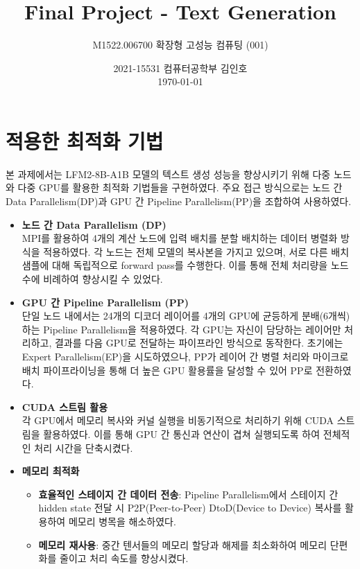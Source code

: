 \documentclass[10pt]{article}
\title{\bfseries Final Project - Text Generation}
\author{M1522.006700 확장형 고성능 컴퓨팅 (001)}
\date{2021-15531 컴퓨터공학부 김인호\\ \today}
\begin{document}
\maketitle

\section{적용한 최적화 기법}

본 과제에서는 LFM2-8B-A1B 모델의 텍스트 생성 성능을 향상시키기 위해 다중 노드와 다중 GPU를 활용한 최적화 기법들을 구현하였다. 주요 접근 방식으로는 노드 간 Data Parallelism(DP)과 GPU 간 Pipeline Parallelism(PP)을 조합하여 사용하였다.

\begin{itemize}
\item \textbf{노드 간 Data Parallelism (DP)}\\
MPI를 활용하여 4개의 계산 노드에 입력 배치를 분할 배치하는 데이터 병렬화 방식을 적용하였다. 각 노드는 전체 모델의 복사본을 가지고 있으며, 서로 다른 배치 샘플에 대해 독립적으로 forward pass를 수행한다. 이를 통해 전체 처리량을 노드 수에 비례하여 향상시킬 수 있었다.

\item \textbf{GPU 간 Pipeline Parallelism (PP)}\\
단일 노드 내에서는 24개의 디코더 레이어를 4개의 GPU에 균등하게 분배(6개씩)하는 Pipeline Parallelism을 적용하였다. 각 GPU는 자신이 담당하는 레이어만 처리하고, 결과를 다음 GPU로 전달하는 파이프라인 방식으로 동작한다. 초기에는 Expert Parallelism(EP)을 시도하였으나, PP가 레이어 간 병렬 처리와 마이크로 배치 파이프라이닝을 통해 더 높은 GPU 활용률을 달성할 수 있어 PP로 전환하였다.

\item \textbf{CUDA 스트림 활용}\\
각 GPU에서 메모리 복사와 커널 실행을 비동기적으로 처리하기 위해 CUDA 스트림을 활용하였다. 이를 통해 GPU 간 통신과 연산이 겹쳐 실행되도록 하여 전체적인 처리 시간을 단축시켰다.

\item \textbf{메모리 최적화}
\begin{itemize}[noitemsep]
    \item \textbf{효율적인 스테이지 간 데이터 전송}: Pipeline Parallelism에서 스테이지 간 hidden state 전달 시 P2P(Peer-to-Peer) DtoD(Device to Device) 복사를 활용하여 메모리 병목을 해소하였다.
    \item \textbf{메모리 재사용}: 중간 텐서들의 메모리 할당과 해제를 최소화하여 메모리 단편화를 줄이고 처리 속도를 향상시켰다.
\end{itemize}


\end{itemize}
\end{document}
